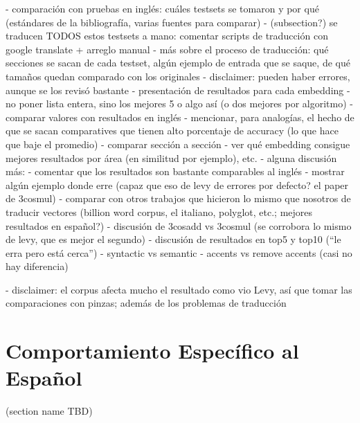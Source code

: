 - comparación con pruebas en inglés: cuáles testsets se tomaron y por qué (estándares de la bibliografía, varias fuentes para comparar)
- (subsection?) se traducen TODOS estos testsets a mano: comentar scripts de traducción con google translate + arreglo manual
    - más sobre el proceso de traducción: qué secciones se sacan de cada testset, algún ejemplo de entrada que se saque, de qué tamaños quedan comparado con los originales
    - disclaimer: pueden haber errores, aunque se los revisó bastante
- presentación de resultados para cada embedding
    - no poner lista entera, sino los mejores 5 o algo así (o dos mejores por algoritmo)
    - comparar valores con resultados en inglés
    - mencionar, para analogías, el hecho de que se sacan comparatives que tienen alto porcentaje de accuracy (lo que hace que baje el promedio)
        - comparar sección a sección
    - ver qué embedding consigue mejores resultados por área (en similitud por ejemplo), etc.
- alguna discusión más:
    - comentar que los resultados son bastante comparables al inglés
    - mostrar algún ejemplo donde erre (capaz que eso de levy de errores por defecto? el paper de 3cosmul)
    - comparar con otros trabajos que hicieron lo mismo que nosotros de traducir vectores (billion word corpus, el italiano, polyglot, etc.; mejores resultados en español?)
    - discusión de 3cosadd vs 3cosmul (se corrobora lo mismo de levy, que es mejor el segundo)
    - discusión de resultados en top5 y top10 (``le erra pero está cerca'')
    - syntactic vs semantic
    - accents vs remove accents (casi no hay diferencia)


- disclaimer: el corpus afecta mucho el resultado como vio Levy, así que tomar las comparaciones con pinzas; además de los problemas de traducción


\section{Comportamiento Específico al Español}
(section name TBD)

